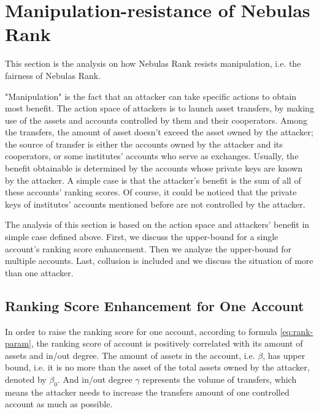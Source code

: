
\section{Manipulation-resistance of Nebulas Rank}

This section is the analysis on how Nebulas Rank resists manipulation, i.e. the fairness of Nebulas Rank.

"Manipulation" is the fact that an attacker can take specific actions to obtain most benefit. The action space of attackers is to launch asset transfers, by making use of the assets and accounts controlled by them and their cooperators. Among the transfers, the amount of asset doesn't exceed the asset owned by the attacker; the source of transfer is either the accounts owned by the attacker and its cooperators, or some institutes' accounts who serve as exchanges. Usually, the benefit obtainable is determined by the accounts whose private keys are known by the attacker. A simple case is that the attacker's benefit is the sum of all of these accounts' ranking scores. Of course, it could be noticed that the private keys of institutes' accounts mentioned before are not controlled by the attacker.

The analysis of this section is based on the action space and attackers' benefit in simple case defined above. First, we discuss the upper-bound for a single account's ranking score enhancement. Then we analyze the upper-bound for multiple accounts. Last, collusion is included and we discuss the situation of more than one attacker.

\subsection{Ranking Score Enhancement for One Account \label{sec:cheat-single}}

In order to raise the ranking score for one account, according to formula \ref{eq:rank-param}, the ranking score of account is positively correlated with its amount of assets and in/out degree. The amount of assets in the account, i.e. $\beta$, has upper bound, i.e. it is no more than the asset of the total assets owned by the attacker, denoted by $\beta_0$. And in/out degree $\gamma$ represents the volume of transfers, which means the attacker needs to increase the transfers amount of one controlled account as much as possible.

